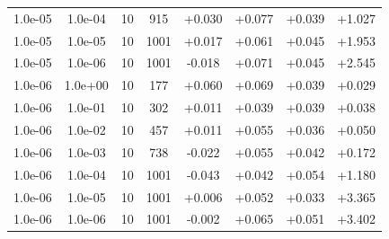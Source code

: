 \documentclass[11pt,a4paper]{article}
\begin{document}
\begin{table}[t]
{\begin{tabular}{*{8}c}
\rowcolor{red} 1.0e-05 	 & 1.0e-04 	 & 10 & 915 	 & +0.030 & +0.077 & +0.039 & +1.027 \\ 
\rowcolor{red} 1.0e-05 	 & 1.0e-05 	 & 10 & 1001 	 & +0.017 & +0.061 & +0.045 & +1.953 \\ 
\rowcolor{red}  1.0e-05 	 & 1.0e-06 	 & 10 & 1001 	 & -0.018 & +0.071 & +0.045 & +2.545 \\ 
 1.0e-06 	 & 1.0e+00 	 & 10 & 177 	 & +0.060 & +0.069 & +0.039 & +0.029 \\ 
 1.0e-06 	 & 1.0e-01 	 & 10 & 302 	 & +0.011 & +0.039 & +0.039 & +0.038 \\ 
 1.0e-06 	 & 1.0e-02 	 & 10 & 457 	 & +0.011 & +0.055 & +0.036 & +0.050 \\ 
\rowcolor{orange} 1.0e-06 	 & 1.0e-03 	 & 10 & 738 	 & -0.022 & +0.055 & +0.042 & +0.172 \\ 
\rowcolor{red}  1.0e-06 	 & 1.0e-04 	 & 10 & 1001 	 & -0.043 & +0.042 & +0.054 & +1.180 \\ 
\rowcolor{red}  1.0e-06 	 & 1.0e-05 	 & 10 & 1001 	 & +0.006 & +0.052 & +0.033 & +3.365 \\ 
\rowcolor{red}  1.0e-06 	 & 1.0e-06 	 & 10 & 1001 	 & -0.002 & +0.065 & +0.051 & +3.402 \\ 
\end{tabular}}
\label{Tab::5}
\end{table} 
\end{document}
